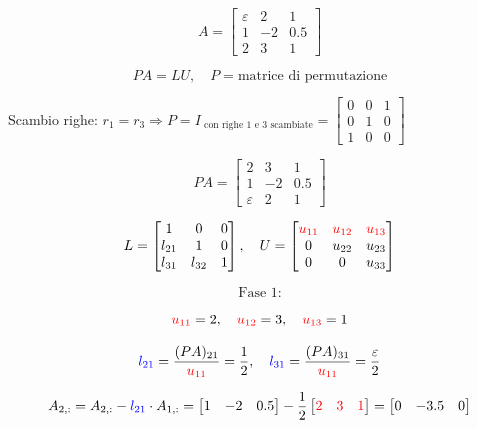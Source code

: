 \documentclass[12pt,a4paper]{article}
\begin{document}
\[
A = \begin{bmatrix} \varepsilon & 2 & 1 \\ 1 & -2 & 0.5 \\ 2 & 3 & 1 \end{bmatrix}
\]

\[
P A = LU,\quad
P = \text{matrice di permutazione}
\]

Scambio righe: \( r_1 = r_3 \Rightarrow P = I_\text{ con righe 1 e 3 scambiate} = \begin{bmatrix} 0 & 0 & 1 \\ 0 & 1 & 0 \\ 1 & 0 & 0 \end{bmatrix} \)

\[
PA = \begin{bmatrix} 2 & 3 & 1 \\ 1 & -2 & 0.5 \\ \varepsilon & 2 & 1 \end{bmatrix}
\]

\[
L = \begin{bmatrix}
1 & 0 & 0 \\
l_{21} & 1 & 0 \\
l_{31} & l_{32} & 1
\end{bmatrix},\quad
U = \begin{bmatrix}
\textcolor{red}{u_{11}} & \textcolor{red}{u_{12}} & \textcolor{red}{u_{13}} \\
0 & u_{22} & u_{23} \\
0 & 0 & u_{33}
\end{bmatrix}
\]

\[
\text{Fase 1:}
\]

\[
\textcolor{red}{u_{11}} = 2,\quad \textcolor{red}{u_{12}} = 3,\quad \textcolor{red}{u_{13}} = 1
\]

\[
\textcolor{blue}{l_{21}} = \dfrac{(PA)_{21}}{\textcolor{red}{u_{11}}} = \dfrac{1}{2},\quad \textcolor{blue}{l_{31}} = \dfrac{(PA)_{31}}{\textcolor{red}{u_{11}}} = \dfrac{\varepsilon}{2}
\]

\[
A_{2,:} = A_{2,:} - \textcolor{blue}{l_{21}} \cdot A_{1,:} =
\begin{bmatrix}
1 & -2 & 0.5
\end{bmatrix}
-
\dfrac{1}{2}
\begin{bmatrix}
\textcolor{red}{2} & \textcolor{red}{3} & \textcolor{red}{1}
\end{bmatrix}
=
\begin{bmatrix}
0 & -3.5 & 0
\end{bmatrix}
\]
\end{document}
